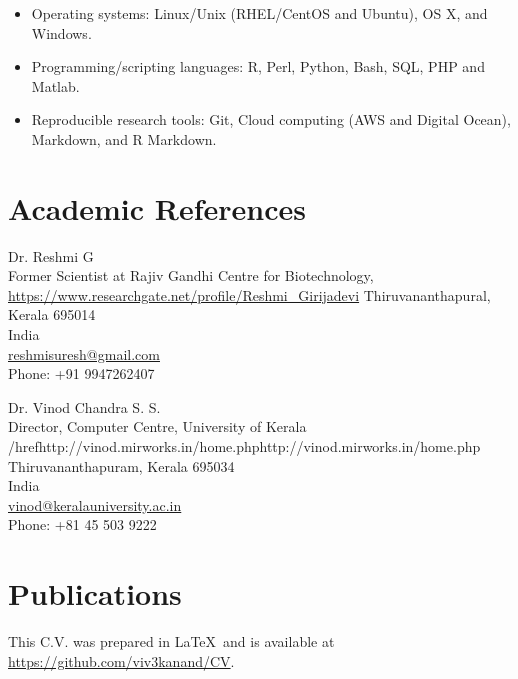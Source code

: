 \documentclass[a4paper, 10pt]{article}
\begin{document}
\begin{itemize}
   \setlength\itemsep{0em}
   \item Operating systems: Linux/Unix (RHEL/CentOS and Ubuntu), OS X, and Windows.
   \item Programming/scripting languages: R, Perl, Python, Bash, SQL, PHP and Matlab.
   \item Reproducible research tools: Git, Cloud computing (AWS and Digital Ocean), Markdown, and R Markdown.
\end{itemize}


\section*{Academic References}

\begin{minipage}[ht]{.50\textwidth}
Dr. Reshmi G \\
Former Scientist at Rajiv Gandhi Centre for Biotechnology, \\
\href{https://www.researchgate.net/profile/Reshmi_Girijadevi}{https://www.researchgate.net/profile/Reshmi_Girijadevi}
Thiruvananthapural, Kerala 695014 \\
India \\
\href{mailto:reshmisuresh@gmail.com}{reshmisuresh@gmail.com} \\
Phone: +91 9947262407
\end{minipage}
\begin{minipage}[ht]{.50\textwidth}
Dr. Vinod Chandra S. S. \\
Director, Computer Centre, University of Kerala \\
/href{http://vinod.mirworks.in/home.php}{http://vinod.mirworks.in/home.php} \\
Thiruvananthapuram, Kerala 695034\\
India \\
\href{mailto:vinod@keralauniversity.ac.in}{vinod@keralauniversity.ac.in} \\
Phone: +81 45 503 9222
\end{minipage}

\section*{Publications}
\begingroup
   \renewcommand{\section}[2]{}
   
   \nocite{*}
   
\endgroup

\vfill

\footnotesize
This C.V. was prepared in \LaTeX\ and is available at \href{https://github.com/davetang/cv}{https://github.com/viv3kanand/CV}.
\end{document}
